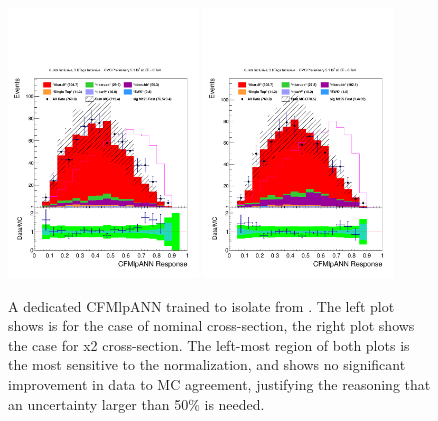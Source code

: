 \begin{description}
    \begin{figure}[hbtp]
 \begin{center}
   \includegraphics[width=0.45\textwidth]{Figures/Analysis_1_Diagrams/d2MCPlots_CFMlpANN_cut2_6JIncl_3TIncl_Combined_HtWgt_ttlf_ttbb_nominal.pdf}
   \includegraphics[width=0.45\textwidth]{Figures/Analysis_1_Diagrams/d2MCPlots_CFMlpANN_cut2_6JIncl_3TIncl_Combined_topPagCSV_ttlf_ttbb_x2ttbbXS.pdf}
   \caption{A dedicated CFMlpANN trained to isolate \ttbb from
     \ttjets.  The left plot shows is for the case of nominal \ttbb
     cross-section, the right plot shows the case for x2 \ttbb
     cross-section.  The left-most region of both plots is the most
     sensitive to the \ttbb normalization, and shows no significant
     improvement in data to MC agreement, justifying the reasoning that
     an uncertainty larger than 50\% is needed.}
   \label{fig:ttbb_ttlf_disc}
 \end{center}
\end{figure}


\end{description}
